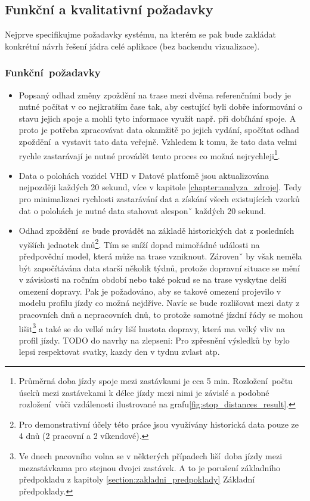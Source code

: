 \subsection{Funkční a kvalitativní požadavky}

Nejprve specifikujme požadavky systému, na kterém se pak bude zakládat
konkrétní návrh řešení jádra celé aplikace (bez backendu vizualizace).

\subsubsection{Funkční požadavky}

\begin{itemize}
	\item
Popsaný odhad změny zpoždění na trase mezi dvěma referenčními body je nutné počítat v co nejkratším čase tak, aby cestující byli dobře informování o stavu jejich spoje a mohli tyto informace využít např. při dobíhání spoje. A proto je potřeba zpracovávat data okamžitě po jejich vydání, spočítat odhad zpoždění a vystavit tato data veřejně. Vzhledem k tomu, že tato data velmi rychle zastarávají je nutné provádět tento proces co možná nejrychleji\footnote{Průměrná doba jízdy spoje mezi zastávkami je cca 5 min. Rozložení počtu úseků mezi zastávekami k délce jízdy mezi nimi je závislé a podobné rozložení vůči vzdálenosti ilustrované na grafu\ref{fig:stop_distances_result}.}.

\item

Data o polohách vozidel VHD v Datové platfomě jsou aktualizována nejpozději každých 20 sekund, více v kapitole \ref{chapter:analyza_zdroje}. Tedy pro minimalizaci rychlosti zastarávání dat a získání všech existujících vzorků dat o polohách je nutné data stahovat alesponˇ každých 20 sekund.

\item

Odhad zpoždění se bude provádět na základě historických dat z posledních vyšších jednotek dnů\footnote{Pro demonstrativní účely této práce jsou využívány historická data pouze ze 4 dnů (2 pracovní a 2 víkendové).}. Tím se sníží dopad mimořádné události na předpovědní model, která může na trase vzniknout. Zárovenˇ by však neměla být započítávána data starší několik týdnů, protože dopravní situace se mění v závislosti na ročním období nebo také pokud se na trase vyskytne delší omezení dopravy. Pak je požadováno, aby se takové omezení projevilo v modelu profilu jízdy co možná nejdříve. Navíc se bude rozlišovat mezi daty z pracovních dnů a nepracovních dnů, to protože samotné jízdní řády se mohou lišit\footnote{Ve dnech pacovního volna se v některých případech liší doba jízdy mezi mezastávkama pro stejnou dvojci zastávek. A to je porušení základního předpokladu z kapitoly \ref{section:zakladni_predpoklady} Základní předpoklady.} a také se do velké míry liší hustota dopravy, která ma velký vliv na profil jízdy. TODO do navrhy na zlepseni: Pro zpřesnění výsledků by bylo lepsi respektovat svatky, kazdy den v tydnu zvlast atp.


\end{itemize}
